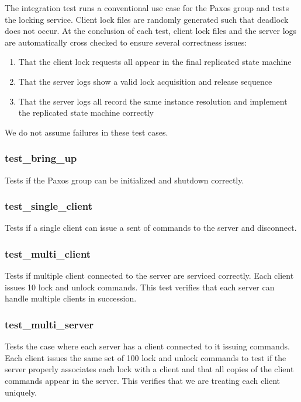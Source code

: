 \documentclass{article}
\begin{document}
The integration test runs a conventional use case for the Paxos group and tests the locking service.
Client lock files are randomly generated such that deadlock does not occur.
At the conclusion of each test, client lock files and the server logs are automatically cross checked to ensure several correctness issues:
\begin{enumerate}
\item That the client lock requests all appear in the final replicated state machine
\item That the server logs show a valid lock acquisition and release sequence
\item That the server logs all record the same instance resolution and implement the replicated state machine correctly
\end{enumerate}

We do not assume failures in these test cases.

\subsubsection{test\_bring\_up}

Tests if the Paxos group can be initialized and shutdown correctly.

\subsubsection{test\_single\_client}

Tests if a single client can issue a sent of commands to the server and disconnect.

\subsubsection{test\_multi\_client}

Tests if multiple client connected to the server are serviced correctly.
Each client issues 10 lock and unlock commands.
This test verifies that each server can handle multiple clients in succession.

\subsubsection{test\_multi\_server}

Tests the case where each server has a client connected to it issuing commands.
Each client issues the same set of 100 lock and unlock commands to test if the server properly associates each lock with a client and that all copies of the client commands appear in the server.
This verifies that we are treating each client uniquely.
\end{document}
